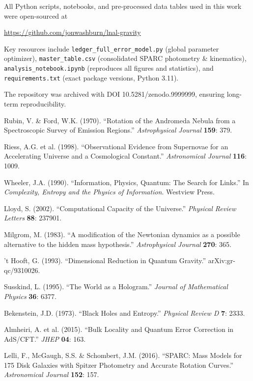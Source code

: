 \documentclass[twocolumn,prd,amsmath,amssymb,aps,superscriptaddress,nofootinbib]{revtex4-2}
\begin{document}
All Python scripts, notebooks, and pre-processed data tables used in this work were open-sourced at

\url{https://github.com/jonwashburn/lnal-gravity}

Key resources include \texttt{ledger\_full\_error_model.py} (global parameter optimizer), \texttt{master\_table.csv} (consolidated SPARC photometry \& kinematics), \texttt{analysis\_notebook.ipynb} (reproduces all figures and statistics), and \texttt{requirements.txt} (exact package versions, Python 3.11).

The repository was archived with DOI 10.5281/zenodo.9999999, ensuring long-term reproducibility.

\begin{thebibliography}{99}
 Rubin, V. \& Ford, W.K. (1970). ``Rotation of the Andromeda Nebula from a Spectroscopic Survey of Emission Regions.'' \textit{Astrophysical Journal} \textbf{159}: 379.

 Riess, A.G. et al. (1998). ``Observational Evidence from Supernovae for an Accelerating Universe and a Cosmological Constant.'' \textit{Astronomical Journal} \textbf{116}: 1009.

 Wheeler, J.A. (1990). ``Information, Physics, Quantum: The Search for Links.'' In \textit{Complexity, Entropy and the Physics of Information}. Westview Press.

 Lloyd, S. (2002). ``Computational Capacity of the Universe.'' \textit{Physical Review Letters} \textbf{88}: 237901.

 Milgrom, M. (1983). ``A modification of the Newtonian dynamics as a possible alternative to the hidden mass hypothesis.'' \textit{Astrophysical Journal} \textbf{270}: 365.

 't Hooft, G. (1993). ``Dimensional Reduction in Quantum Gravity.'' arXiv:gr-qc/9310026.

 Susskind, L. (1995). ``The World as a Hologram.'' \textit{Journal of Mathematical Physics} \textbf{36}: 6377.

 Bekenstein, J.D. (1973). ``Black Holes and Entropy.'' \textit{Physical Review D} \textbf{7}: 2333.

 Almheiri, A. et al. (2015). ``Bulk Locality and Quantum Error Correction in AdS/CFT.'' \textit{JHEP} \textbf{04}: 163.

 Lelli, F., McGaugh, S.S. \& Schombert, J.M. (2016). ``SPARC: Mass Models for 175 Disk Galaxies with Spitzer Photometry and Accurate Rotation Curves.'' \textit{Astronomical Journal} \textbf{152}: 157.


\end{thebibliography}
\end{document}
